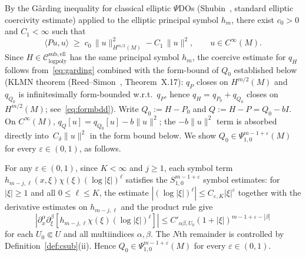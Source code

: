 \documentclass[12pt]{amsart}
\newcommand{\Csub}{\mathcal{C}_{\mathrm{logpoly}}^{\mathrm{sub,ell}}}
\begin{document}
By the G\r{a}rding inequality for classical elliptic $\Psi$DOs
(Shubin~\cite{Shubin2001}, standard elliptic coercivity estimate) applied to the
elliptic principal symbol $h_m$, there exist $c_0>0$ and $C_1<\infty$ such that
\begin{equation}
  \label{eq:garding}
  \langle Pu,u\rangle \;\ge\; c_0\,\|u\|^2_{H^{m/2}(M)} - C_1\,\|u\|^2,
  \qquad u\in C^\infty(M).
\end{equation}
Since $H\in\Csub$ has the same principal symbol $h_m$,
the coercive estimate for $q_H$ follows from~\eqref{eq:garding} combined
with the form-bound of $Q_0$ established below
(KLMN theorem (Reed--Simon~\cite{RS1975}, Theorem~X.17): $q_P$ closes on $H^{m/2}(M)$ and $q_{Q_0}$ is
infinitesimally form-bounded w.r.t.\ $q_P$, hence $q_H=q_{P_0}+q_{Q_0}$
closes on $H^{m/2}(M)$; see~\eqref{eq:formbdd}).
Write $Q_0:=H-P_0$ and $Q:=H-P=Q_0-bI$.
On $C^\infty(M)$, $q_Q[u]=q_{Q_0}[u]-b\|u\|^2$; the $-b\|u\|^2$ term
is absorbed directly into~$C_\delta\|u\|^2$ in the form bound below.
We show $Q_0\in\Psi^{m-1+\varepsilon}_{1,0}(M)$ for every $\varepsilon\in(0,1)$,
as follows.

For any $\varepsilon\in(0,1)$, since $K<\infty$ and $j\ge 1$,
each symbol term $h_{m-j,\ell}(x,\xi)\chi(\xi)(\log|\xi|)^\ell$ satisfies
the $S^{m-1+\varepsilon}_{1,0}$ symbol estimates: for $|\xi|\ge 1$ and all
$0\le\ell\le K$, the estimate $|(\log|\xi|)^\ell|\le C_{\varepsilon,K}|\xi|^\varepsilon$
together with the derivative estimates on $h_{m-j,\ell}$ and the
product rule give
\[
  |\partial_x^\alpha\partial_\xi^\beta[h_{m-j,\ell}\chi(\xi)(\log|\xi|)^\ell]|
  \le C'_{\alpha\beta,U_0}(1+|\xi|)^{m-1+\varepsilon-|\beta|}
\]
for each $U_0\Subset U$ and all multiindices $\alpha,\beta$.
The $N$th remainder is controlled by Definition~\ref{def:csub}(ii).
Hence $Q_0\in\Psi^{m-1+\varepsilon}_{1,0}(M)$ for every $\varepsilon\in(0,1)$.
\end{document}
